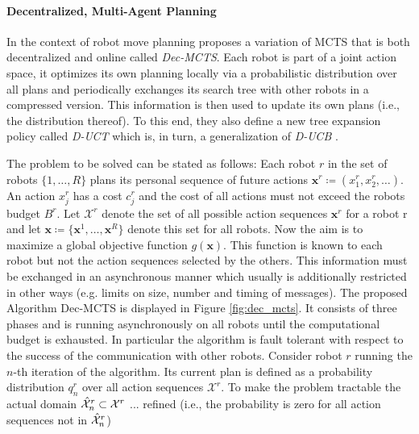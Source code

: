 \paragraph{Decentralized, Multi-Agent Planning}
In the context of robot move planning \cite{best2019dec} proposes a variation of MCTS that is both decentralized and online called \textit{Dec-MCTS}. Each robot is part of a joint action space, it optimizes its own planning locally via a probabilistic distribution over all plans and periodically exchanges its search tree with other robots in a compressed version. This information is then used to update its own plans (i.e., the distribution thereof). To this end, they also define a new tree expansion policy called \textit{D-UCT} which is, in turn, a generalization of \textit{D-UCB} \cite{garivier2011upper}.

The problem to be solved can be stated as follows: Each robot $r$ in the set of robots $\{1,\ldots,R\}$ plans its personal sequence of future actions $ \mathbf{x}^r \coloneqq (x_1^r,x_2^r,\ldots)$. An action $x_j^r$ has a cost $c_j^r$ and the cost of all actions must not exceed the robots budget $B^r$.
Let $\mathcal{X}^r$ denote the set of all possible action sequences $\mathbf{x}^r$ for a robot r and let $\mathbf{x} \coloneqq \{\mathbf{x}
^1, \ldots , \mathbf{x}^R\}$ denote this set for all robots. 
Now the aim is to maximize a global objective function $g(\mathbf{x})$. This function is known to each robot but not the action sequences selected by the others. This information must be exchanged in an asynchronous manner which usually is additionally restricted in other ways (e.g. limits on size, number and timing of messages). 
The proposed Algorithm Dec-MCTS is displayed in Figure \ref{fig:dec_mcts}. It consists of three phases and is running asynchronously on all robots until the computational budget is exhausted. In particular the algorithm is fault tolerant with respect to the success of the communication with other robots. Consider robot $r$ running the $n$-th iteration of the algorithm. Its current plan is defined as a probability distribution $q^r_n$ over all action sequences $\mathcal{X}^r$. To make the problem tractable the actual domain $\Hat{\mathcal{X}}^r_n \subset \mathcal{X}^r$ ... refined (i.e., the probability is zero for all action sequences not in $\Hat{\mathcal{X}}^r_n$)

